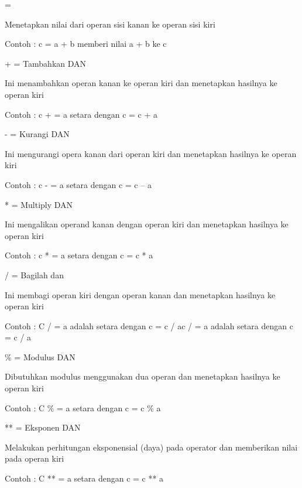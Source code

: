 \noindent 
= \par
\noindent 
Menetapkan nilai dari operan sisi kanan ke operan sisi kiri \hspace*{4.41in}  \par
\noindent 
Contoh : c = a + b memberi nilai a + b ke c \par
\noindent 
\vspace{12pt}
\noindent 
+ = Tambahkan DAN \par
\noindent 
Ini menambahkan operan kanan ke operan kiri dan menetapkan hasilnya ke operan kiri \par
\noindent 
Contoh : c + = a setara dengan c = c + a \par
\noindent 
\vspace{12pt}
\noindent 
- = Kurangi DAN \par
\noindent 
Ini mengurangi opera kanan dari operan kiri dan menetapkan hasilnya ke operan kiri \par
\noindent 
Contoh : c - = a setara dengan c = c – a \par
\noindent 
\vspace{12pt}
\noindent 
* = Multiply DAN \par
\noindent 
Ini mengalikan operand kanan dengan operan kiri dan menetapkan hasilnya ke operan kiri \par
\noindent 
Contoh : c * = a setara dengan c = c * a \par
\noindent 
\vspace{12pt}
\noindent 
/ = Bagilah dan \par
\noindent 
Ini membagi operan kiri dengan operan kanan dan menetapkan hasilnya ke operan kiri \par
\noindent 
Contoh : C / = a adalah setara dengan c = c / ac / = a adalah setara dengan c = c / a \par
\noindent 
\vspace{12pt}
\noindent 
 $  \%  $ = Modulus DAN \par
\noindent 
Dibutuhkan modulus menggunakan dua operan dan menetapkan hasilnya ke operan kiri \par
\noindent 
Contoh : C $  \%  $ = a setara dengan c = c $  \%  $ a \par
\noindent 
\vspace{12pt}
\noindent 
** = Eksponen DAN \par
\noindent 
Melakukan perhitungan eksponensial (daya) pada operator dan memberikan nilai pada operan kiri \par
\noindent 
Contoh : C ** = a setara dengan c = c ** a \par
